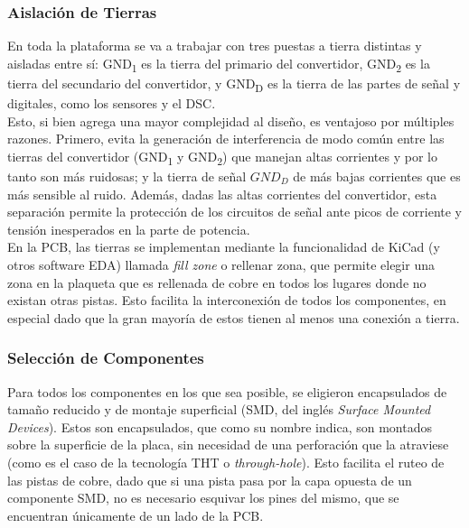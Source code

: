 \subsubsection{Aislación de Tierras}

En toda la plataforma se va a trabajar con tres puestas a tierra distintas y aisladas entre sí: GND\textsubscript{1} es la tierra del primario del convertidor, GND\textsubscript{2} es la tierra del secundario del convertidor, y GND\textsubscript{D} es la tierra de las partes de señal y digitales, como los sensores y el DSC.\\

Esto, si bien agrega una mayor complejidad al diseño, es ventajoso por múltiples razones. Primero, evita la generación de interferencia de modo común entre las tierras del convertidor (GND\textsubscript{1} y GND\textsubscript{2}) que manejan altas corrientes y por lo tanto son más ruidosas; y la tierra de señal $GND_D$ de más bajas corrientes que es más sensible al ruido. Además, dadas las altas corrientes del convertidor, esta separación permite la protección de los circuitos de señal ante picos de corriente y tensión inesperados en la parte de potencia.\\

En la PCB, las tierras se implementan mediante la funcionalidad de KiCad (y otros software EDA) llamada \textit{fill zone} o rellenar zona, que permite elegir una zona en la plaqueta que es rellenada de cobre en todos los lugares donde no existan otras pistas. Esto facilita la interconexión de todos los componentes, en especial dado que la gran mayoría de estos tienen al menos una conexión a tierra.\\

\subsubsection{Selección de Componentes}

Para todos los componentes en los que sea posible, se eligieron encapsulados de tamaño reducido y de montaje superficial (SMD, del inglés \textit{Surface Mounted Devices}). Estos son encapsulados, que como su nombre indica, son montados sobre la superficie de la placa, sin necesidad de una perforación que la atraviese (como es el caso de la tecnología THT o \textit{through-hole}). Esto facilita el ruteo de las pistas de cobre, dado que si una pista pasa por la capa opuesta de un componente SMD, no es necesario esquivar los pines del mismo, que se encuentran únicamente de un lado de la PCB.\\

